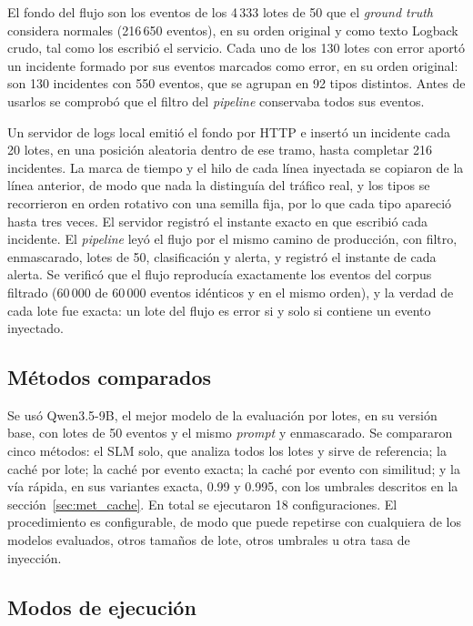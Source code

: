 El fondo del flujo son los eventos de los 4\,333 lotes de 50 que el \textit{ground truth} considera normales (216\,650 eventos), en su orden original y como texto Logback crudo, tal como los escribió el servicio. Cada uno de los 130 lotes con error aportó un incidente formado por sus eventos marcados como error, en su orden original: son 130 incidentes con 550 eventos, que se agrupan en 92 tipos distintos. Antes de usarlos se comprobó que el filtro del \textit{pipeline} conservaba todos sus eventos.

Un servidor de logs local emitió el fondo por HTTP e insertó un incidente cada 20 lotes, en una posición aleatoria dentro de ese tramo, hasta completar 216 incidentes. La marca de tiempo y el hilo de cada línea inyectada se copiaron de la línea anterior, de modo que nada la distinguía del tráfico real, y los tipos se recorrieron en orden rotativo con una semilla fija, por lo que cada tipo apareció hasta tres veces. El servidor registró el instante exacto en que escribió cada incidente. El \textit{pipeline} leyó el flujo por el mismo camino de producción, con filtro, enmascarado, lotes de 50, clasificación y alerta, y registró el instante de cada alerta. Se verificó que el flujo reproducía exactamente los eventos del corpus filtrado (60\,000 de 60\,000 eventos idénticos y en el mismo orden), y la verdad de cada lote fue exacta: un lote del flujo es error si y solo si contiene un evento inyectado.

\subsection{Métodos comparados}

Se usó Qwen3.5-9B, el mejor modelo de la evaluación por lotes, en su versión base, con lotes de 50 eventos y el mismo \textit{prompt} y enmascarado. Se compararon cinco métodos: el SLM solo, que analiza todos los lotes y sirve de referencia; la caché por lote; la caché por evento exacta; la caché por evento con similitud; y la vía rápida, en sus variantes exacta, 0.99 y 0.995, con los umbrales descritos en la sección~\ref{sec:met_cache}. En total se ejecutaron 18 configuraciones. El procedimiento es configurable, de modo que puede repetirse con cualquiera de los modelos evaluados, otros tamaños de lote, otros umbrales u otra tasa de inyección.

\subsection{Modos de ejecución}

